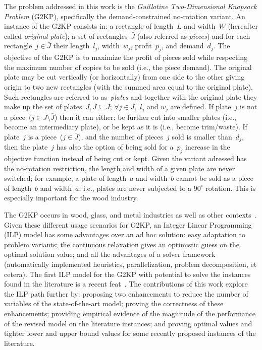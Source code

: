 \documentclass[smallextended]{svjour3}       %
\begin{document}
The problem addressed in this work is the \emph{Guillotine Two-Dimensional Knapsack Problem} (G2KP), specifically the demand-constrained no-rotation variant.
An instance of the G2KP consists in: a rectangle of length~\(L\) and width~\(W\) (hereafter called \emph{original plate}); a set of rectangles~\(\bar{J}\) (also referred as \emph{pieces}) and for each rectangle~\(j \in \bar{J}\) their length~\(l_j\), width~\(w_j\), profit~\(p_j\), and demand~\(d_j\).
The objective of the G2KP is to maximize the profit of pieces sold while respecting the maximum number of copies to be sold (i.e., the piece demand).
The original plate may be cut vertically (or horizontally) from one side to the other giving origin to two new rectangles (with the summed area equal to the original plate).
Such rectangles are referred to as~\emph{plates} and together with the original plate they make up the set of plates~\(J, \bar{J} \subseteq J\); \(\forall j \in J, \) \(l_j\) and \(w_j\) are defined.
If plate~\(j\) is not a piece~(\(j \in J\setminus\bar{J}\)) then it can either: be further cut into smaller plates (i.e., become an intermediary plate), or be kept as it is (i.e., become trim/waste).
If plate~\(j\) is a piece~(\(j \in \bar{J}\)), and the number of pieces~\(j\) sold is smaller than~\(d_j\), then the plate~\(j\) has also the option of being sold for a~\(p_j\) increase in the objective function instead of being cut or kept.
Given the variant adressed has the no-rotation restriction, the length and width of a given plate are never switched; for example, a plate of length~\(a\) and width~\(b\) cannot be sold as a piece of length~\(b\) and width~\(a\); i.e., plates are never subjected to a \(90^\circ\) rotation. This is especially important for the wood industry.

The G2KP occurs in wood, glass, and metal industries as well as other contexts~\cite[p. 6]{dimitri_thesis}.
Given these different usage scenarios for G2KP, an Integer Linear Programming (ILP) model has some advantages over an ad hoc solution: easy adaptation to problem variants; the continuous relaxation gives an optimistic guess on the optimal solution value; and all the advantages of a solver framework (automatically implemented heuristics, parallelization, problem decomposition, et cetera).
The first ILP model for the G2KP with potential to solve the instances found in the literature is a recent feat~\cite{furini:2016}.
The contributions of this work explore the ILP path further by: proposing two enhancements to reduce the number of variables of the state-of-the-art model; proving the correctness of these enhancements; providing empirical evidence of the magnitude of the performance of the revised model on the literature instances; and proving optimal values and tighter lower and upper bound values for some recently proposed instances of the literature.
\end{document}
